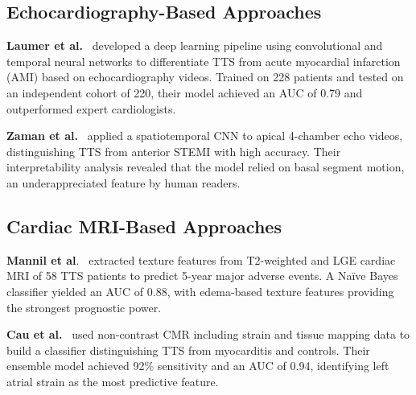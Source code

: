 \documentclass[12pt, BSc]{muthesis}
\begin{document}
\subsection{Echocardiography-Based Approaches}
\textbf{Laumer et al.}~\cite{laumer2022assessment} developed a deep learning pipeline using convolutional and temporal neural networks to differentiate TTS from acute myocardial infarction (AMI) based on echocardiography videos. Trained on 228 patients and tested on an independent cohort of 220, their model achieved an AUC of 0.79 and outperformed expert cardiologists.

\textbf{Zaman et al.}~\cite{Zaman2023Deep} applied a spatiotemporal CNN to apical 4-chamber echo videos, distinguishing TTS from anterior STEMI with high accuracy. Their interpretability analysis revealed that the model relied on basal segment motion, an underappreciated feature by human readers.

\subsection{Cardiac MRI-Based Approaches}
\textbf{Mannil et al}.~\cite{Mannil2020Prognostic} extracted texture features from T2-weighted and LGE cardiac MRI of 58 TTS patients to predict 5-year major adverse events. A Naïve Bayes classifier yielded an AUC of 0.88, with edema-based texture features providing the strongest prognostic power.

\textbf{Cau et al.}~\cite{Cau2023Artificial} used non-contrast CMR including strain and tissue mapping data to build a classifier distinguishing TTS from myocarditis and controls. Their ensemble model achieved 92\% sensitivity and an AUC of 0.94, identifying left atrial strain as the most predictive feature.



\end{document}
